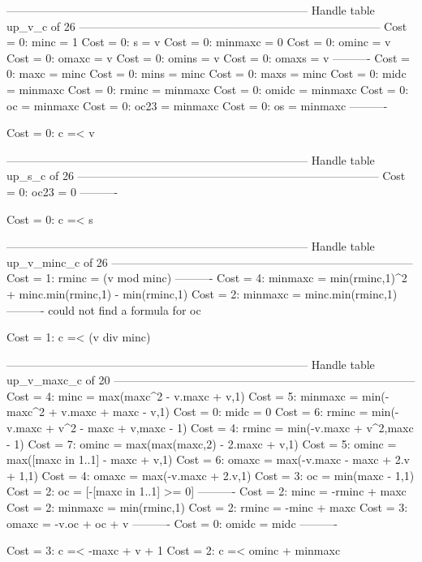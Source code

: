 --------------------------------------------------------------------------------
Handle table up_v_c of 26
--------------------------------------------------------------------------------
Cost =  0:  minc    = 1
Cost =  0:  s       = v
Cost =  0:  minmaxc = 0
Cost =  0:  ominc   = v
Cost =  0:  omaxc   = v
Cost =  0:  omins   = v
Cost =  0:  omaxs   = v
----------
Cost =  0:  maxc    = minc
Cost =  0:  mins    = minc
Cost =  0:  maxs    = minc
Cost =  0:  midc    = minmaxc
Cost =  0:  rminc   = minmaxc
Cost =  0:  omidc   = minmaxc
Cost =  0:  oc      = minmaxc
Cost =  0:  oc23    = minmaxc
Cost =  0:  os      = minmaxc
----------

Cost =  0:  c =< v

--------------------------------------------------------------------------------
Handle table up_s_c of 26
--------------------------------------------------------------------------------
Cost =  0:  oc23 = 0
----------

Cost =  0:  c =< s

--------------------------------------------------------------------------------
Handle table up_v_minc_c of 26
--------------------------------------------------------------------------------
Cost =  1:  rminc   = (v mod minc)
----------
Cost =  4:  minmaxc = min(rminc,1)^2 + minc.min(rminc,1) - min(rminc,1)
Cost =  2:  minmaxc = minc.min(rminc,1)
----------
could not find a formula for oc

Cost =  1:  c =< (v div minc)

--------------------------------------------------------------------------------
Handle table up_v_maxc_c of 20
--------------------------------------------------------------------------------
Cost =  4:  minc    = max(maxc^2 - v.maxc + v,1)
Cost =  5:  minmaxc = min(-maxc^2 + v.maxc + maxc - v,1)
Cost =  0:  midc    = 0
Cost =  6:  rminc   = min(-v.maxc + v^2 - maxc + v,maxc - 1)
Cost =  4:  rminc   = min(-v.maxc + v^2,maxc - 1)
Cost =  7:  ominc   = max(max(maxc,2) - 2.maxc + v,1)
Cost =  5:  ominc   = max([maxc in 1..1] - maxc + v,1)
Cost =  6:  omaxc   = max(-v.maxc - maxc + 2.v + 1,1)
Cost =  4:  omaxc   = max(-v.maxc + 2.v,1)
Cost =  3:  oc      = min(maxc - 1,1)
Cost =  2:  oc      = [-[maxc in 1..1] >= 0]
----------
Cost =  2:  minc    = -rminc + maxc
Cost =  2:  minmaxc = min(rminc,1)
Cost =  2:  rminc   = -minc + maxc
Cost =  3:  omaxc   = -v.oc + oc + v
----------
Cost =  0:  omidc   = midc
----------

Cost =  3:  c =< -maxc + v + 1
Cost =  2:  c =< ominc + minmaxc

